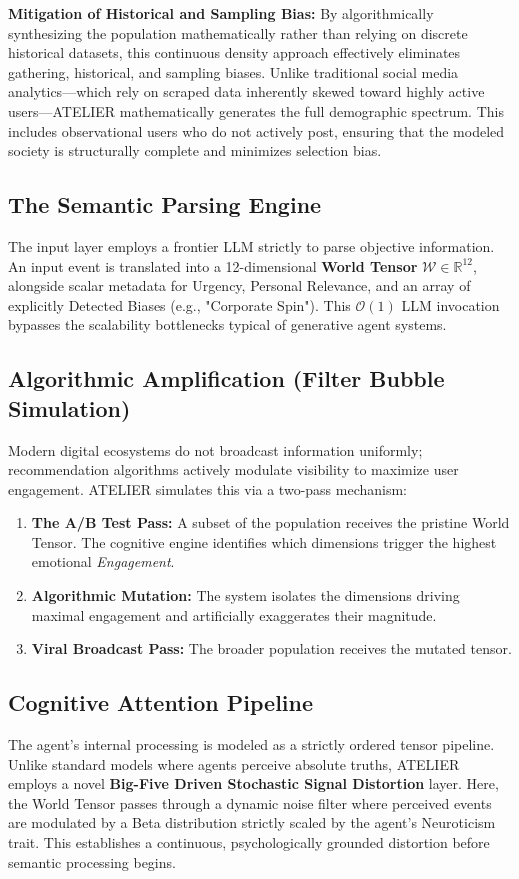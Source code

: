 \documentclass[12pt]{IEEEtran}
\begin{document}
\textbf{Mitigation of Historical and Sampling Bias:} By algorithmically synthesizing the population mathematically rather than relying on discrete historical datasets, this continuous density approach effectively eliminates gathering, historical, and sampling biases. Unlike traditional social media analytics—which rely on scraped data inherently skewed toward highly active users—ATELIER mathematically generates the full demographic spectrum. This includes observational users who do not actively post, ensuring that the modeled society is structurally complete and minimizes selection bias.

\subsection{The Semantic Parsing Engine}
The input layer employs a frontier LLM strictly to parse objective information. An input event is translated into a 12-dimensional \textbf{World Tensor} $\mathcal{W} \in \mathbb{R}^{12}$, alongside scalar metadata for Urgency, Personal Relevance, and an array of explicitly Detected Biases (e.g., "Corporate Spin"). This $\mathcal{O}(1)$ LLM invocation bypasses the scalability bottlenecks typical of generative agent systems.

\subsection{Algorithmic Amplification (Filter Bubble Simulation)}
Modern digital ecosystems do not broadcast information uniformly; recommendation algorithms actively modulate visibility to maximize user engagement. ATELIER simulates this via a two-pass mechanism:
\begin{enumerate}
    \item \textbf{The A/B Test Pass:} A subset of the population receives the pristine World Tensor. The cognitive engine identifies which dimensions trigger the highest emotional \textit{Engagement}.
    \item \textbf{Algorithmic Mutation:} The system isolates the dimensions driving maximal engagement and artificially exaggerates their magnitude.
    \item \textbf{Viral Broadcast Pass:} The broader population receives the mutated tensor.
\end{enumerate}

\subsection{Cognitive Attention Pipeline}
The agent's internal processing is modeled as a strictly ordered tensor pipeline. Unlike standard models where agents perceive absolute truths, ATELIER employs a novel \textbf{Big-Five Driven Stochastic Signal Distortion} layer. Here, the World Tensor passes through a dynamic noise filter where perceived events are modulated by a Beta distribution strictly scaled by the agent's Neuroticism trait. This establishes a continuous, psychologically grounded distortion before semantic processing begins.
\end{document}

